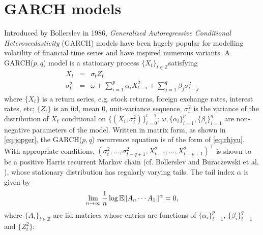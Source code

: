 
\section{GARCH models}
Introduced by Bollerslev \cite{bollerslev:1986} in 1986,
{\em Generalized Autoregressive Conditional Heteroscedasticity}
(GARCH) models have been hugely popular for modelling volatility of
financial time series and have inspired numerous variants.
A GARCH($p, q$) model is a stationary process
$\{X_t\}_{t \in \mathbb Z}$satisfying
\begin{eqnarray*}
  X_t &=& \sigma_t Z_t \\
  \sigma_t^2 &=& \omega + \sum_{i=1}^p \alpha_i X_{t-i}^2 +
  \sum_{j=1}^q \beta_j \sigma_{t-j}^2
\end{eqnarray*}
where $\{X_t\}$ is a return series, e.g. stock returns, foreign exchange
rates, interest rates, etc; $\{Z_t\}$ is an iid, mean 0, unit-variance
sequence, $\sigma_t^2$ is the variance of the distribution of $X_t$
conditional on
$\{(X_i, \sigma_i^2)\}_{i=0}^{t-1}$; $\omega, \{\alpha_i\}_{i=1}^p,
\{\beta_i\}_{i=1}^q$ are non-negative parameters of the model.
Written in matrix form, as shown in \eqref{eq:jopger}, the
GARCH($p,q$) recurrence  equation is of the form of
\eqref{eq:rhjyu}. With appropriate conditions,
$(\sigma_t^2, \dots, \sigma_{t-q+1}^2, X_{t-1}^2, \dots, X_{t - p
  +1}^2)^\top$ is shown to be a positive Harris recurrent Markov chain
(cf. Bollerslev \cite{bollerslev:1986} and Buraczewski et al.
\cite{buraczewski:damek:mikosch:2016}), whose stationary distribution
has regularly varying tails. The tail index $\alpha$ is given by
\begin{equation}
  \label{eq:grgbg}
  \lim_{n \to \infty} {1 \over n}\log\mathbb{E}\|A_n \cdots A_1\|^\alpha = 0,
\end{equation}
where $\{A_i\}_{i \in \mathbb Z}$ are iid matrices whose entries are
functions of $\{\alpha_i\}_{i=1}^p$, $\{\beta_i\}_{i=1}^q$ and
$\{Z_t^2\}$:
